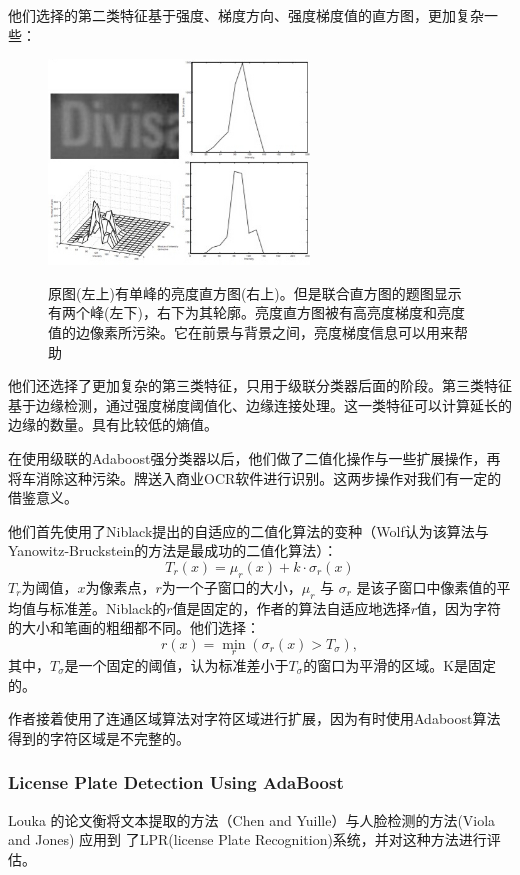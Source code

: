 他们选择的第二类特征基于强度、梯度方向、强度梯度值的直方图，更加复杂一些：

\begin{figure}[H]
    \centering 
    \includegraphics[width=0.618\textwidth]{image/2_1_1_8.jpg}    
    \label{logic}
    \caption{原图(左上)有单峰的亮度直方图(右上)。但是联合直方图的题图显示有两个峰(左下)，右下为其轮廓。亮度直方图被有高亮度梯度和亮度值的边像素所污染。它在前景与背景之间，亮度梯度信息可以用来帮助}
\end{figure}
他们还选择了更加复杂的第三类特征，只用于级联分类器后面的阶段。第三类特征基于边缘检测，通过强度梯度阈值化、边缘连接处理。这一类特征可以计算延长的边缘的数量。具有比较低的熵值。

在使用级联的Adaboost强分类器以后，他们做了二值化操作与一些扩展操作，再将车消除这种污染。牌送入商业OCR软件进行识别。这两步操作对我们有一定的借鉴意义。

他们首先使用了Niblack提出的自适应的二值化算法的变种（Wolf认为该算法与Yanowitz-Bruckstein的方法是最成功的二值化算法）：
$$T_r(x)=\mu_r(x)+k\cdot \sigma_r(x)$$
$T_r$为阈值，$x$为像素点，$r$为一个子窗口的大小，$\mu_r$ 与 $\sigma_r$ 是该子窗口中像素值的平均值与标准差。Niblack的$r$值是固定的，作者的算法自适应地选择$r$值，因为字符的大小和笔画的粗细都不同。他们选择：
$$r(x)=\min_r(\sigma_r(x)>T_\sigma),$$
其中，$T_\sigma$是一个固定的阈值，认为标准差小于$T_\sigma$的窗口为平滑的区域。K是固定的。

作者接着使用了连通区域算法对字符区域进行扩展，因为有时使用Adaboost算法得到的字符区域是不完整的。
\subsubsection{License Plate Detection Using AdaBoost}
Louka 的论文\cite{plate_dection_using_adaboost}衡将文本提取的方法（Chen and Yuille）与人脸检测的方法(Viola and Jones) 应用到 了LPR(license Plate Recognition)系统，并对这种方法进行评估。

